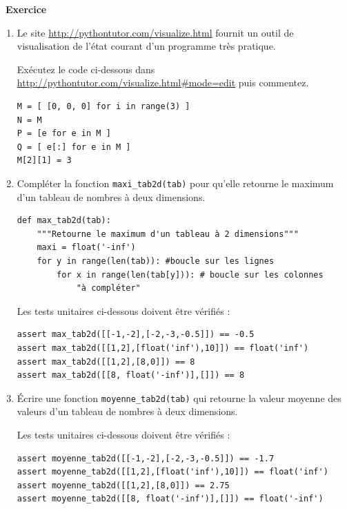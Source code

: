 \documentclass[a4paper, french, 12pt]{article}
\newcounter{exo}
\newenvironment{exercice}[1]
{\par \medskip   \addtocounter{exo}{1} \noindent  
\begin{bclogo}[arrondi =0.1,   noborder = true, logo=\bccrayon, marge=4]{~\textbf{Exercice} \textbf{\theexo} {\itshape #1} }  \par}
{
\end{bclogo}
 \par \bigskip }
\newcounter{def}
\newcounter{prog}
\begin{document}
\begin{exercice}{}

\begin{enumerate}
	\item Le site \url{http://pythontutor.com/visualize.html} fournit un outil de visualisation de l'état courant d'un programme très pratique. 

Exécutez le code ci-dessous dans \url{http://pythontutor.com/visualize.html#mode=edit} puis commentez.

\begin{lstlisting}[style=rond]
M = [ [0, 0, 0] for i in range(3) ]
N = M
P = [e for e in M ]
Q = [ e[:] for e in M ]
M[2][1] = 3
\end{lstlisting}


\item Compléter la  fonction \texttt{maxi\_tab2d(tab)} pour qu'elle retourne le maximum d'un tableau de nombres à deux dimensions.


\begin{lstlisting}[style=rond]
def max_tab2d(tab):
    """Retourne le maximum d'un tableau à 2 dimensions"""
    maxi = float('-inf')
    for y in range(len(tab)): #boucle sur les lignes
        for x in range(len(tab[y])): # boucle sur les colonnes
            "à compléter"
\end{lstlisting}


Les tests unitaires ci-dessous doivent être vérifiés :

\begin{lstlisting}[style=rond]
assert max_tab2d([[-1,-2],[-2,-3,-0.5]]) == -0.5
assert max_tab2d([[1,2],[float('inf'),10]]) == float('inf')
assert max_tab2d([[1,2],[8,0]]) == 8
assert max_tab2d([[8, float('-inf')],[]]) == 8
\end{lstlisting}


\item Écrire une fonction  \texttt{moyenne\_tab2d(tab)} qui retourne la valeur moyenne des valeurs  d'un tableau de nombres à deux dimensions.

Les tests unitaires ci-dessous doivent être vérifiés :

\begin{lstlisting}[style=rond]
assert moyenne_tab2d([[-1,-2],[-2,-3,-0.5]]) == -1.7
assert moyenne_tab2d([[1,2],[float('inf'),10]]) == float('inf')
assert moyenne_tab2d([[1,2],[8,0]]) == 2.75
assert moyenne_tab2d([[8, float('-inf')],[]]) == float('-inf')
\end{lstlisting}


\end{enumerate}


\end{exercice}
\end{document}
